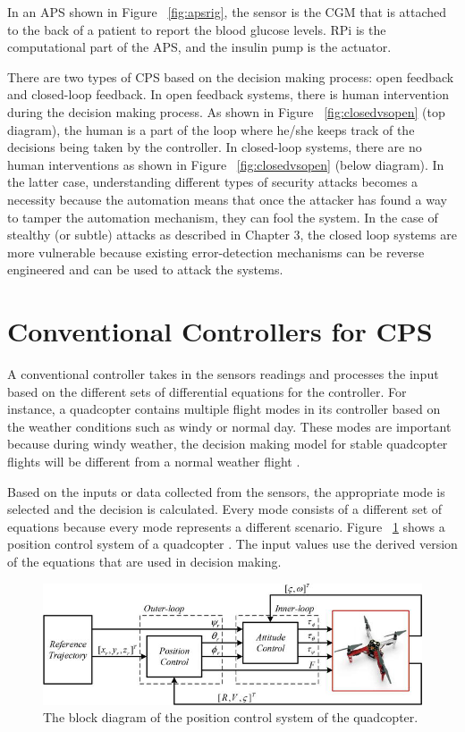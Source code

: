 In an \ac{APS} shown in Figure ~\ref{fig:apsrig}, the sensor is the \ac{CGM} that is attached to the back of a patient to report the blood glucose levels.  
\ac{RPi} is the computational part of the \ac{APS}, and the insulin pump is the actuator. 

There are two types of CPS based on the decision making process: open feedback and closed-loop feedback.
In open feedback systems, there is human intervention during the decision making process. 
As shown in Figure ~\ref{fig:closedvsopen} (top diagram), the human is a part of the loop where he/she keeps track of the decisions being taken by the controller. 
In closed-loop systems, there are no human interventions 
as shown in Figure ~\ref{fig:closedvsopen} (below diagram). 
In the latter case, understanding different types of security attacks becomes a necessity because the automation means that once the attacker has found a way to tamper the automation mechanism, they can fool the system. 
In the case of stealthy (or subtle) attacks as described in Chapter 3, 
the closed loop systems are more vulnerable because existing error-detection mechanisms can be reverse engineered and can be used to attack the systems. 

\section{Conventional Controllers for CPS}

A conventional controller takes in the sensors readings and processes the input based on the different sets of differential equations for the controller. 
For instance, a quadcopter contains multiple flight modes in its controller based on the weather conditions such as windy or normal day. 
These modes are important because during windy weather, the decision making model for stable quadcopter flights will be different from a normal weather flight \cite{inbook}. 

Based on the inputs or data collected from the sensors, the appropriate  mode is selected and the decision is calculated. 
Every mode consists of a different set of equations because every mode represents a different scenario.
Figure ~\ref{fig:controltheory} shows a position control system of a quadcopter \cite{inbook}. The input values use the derived version of the equations that are used in decision making. 

\begin{figure}
	\centering
	\includegraphics[width=0.7\linewidth]{Images/controltheory}
	\caption{The block diagram of the position control system of the quadcopter.
	}
	\label{fig:controltheory} 
\end{figure}



